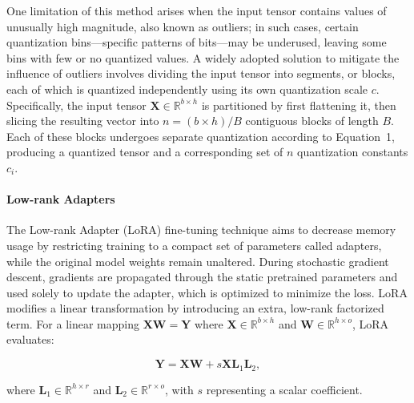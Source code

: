 One limitation of this method arises when the input tensor contains values of unusually high magnitude, also known as outliers; in such cases, certain quantization bins—specific patterns of bits—may be underused, leaving some bins with few or no quantized values. A widely adopted solution to mitigate the influence of outliers involves dividing the input tensor into segments, or blocks, each of which is quantized independently using its own quantization scale $c$. Specifically, the input tensor $\mathbf{X}\in \mathbb{R}^{b\times h}$ is partitioned by first flattening it, then slicing the resulting vector into $n = ({b\times h})/{B}$ contiguous blocks of length $B$. Each of these blocks undergoes separate quantization according to Equation~1, producing a quantized tensor and a corresponding set of $n$ quantization constants $c_i$.

\paragraph{Low-rank Adapters} The Low-rank Adapter (LoRA) fine-tuning technique \citep{hu2021lora} aims to decrease memory usage by restricting training to a compact set of parameters called adapters, while the original model weights remain unaltered. During stochastic gradient descent, gradients are propagated through the static pretrained parameters and used solely to update the adapter, which is optimized to minimize the loss. LoRA modifies a linear transformation by introducing an extra, low-rank factorized term. For a linear mapping ${\mathbf{X}\mathbf{W} = \mathbf{Y}}$ where $\mathbf{X}\in  \mathbb{R}^{b\times h}$ and $\mathbf{W}\in  \mathbb{R}^{h\times o}$, LoRA evaluates:

\begin{equation}
    \mathbf{Y} = \mathbf{X}\mathbf{W} + s\mathbf{X}\mathbf{L}_1\mathbf{L}_2,
\end{equation}

where $\mathbf{L}_1\in  \mathbb{R}^{h\times r}$ and $\mathbf{L}_2\in  \mathbb{R}^{r\times o}$, with $s$ representing a scalar coefficient.

